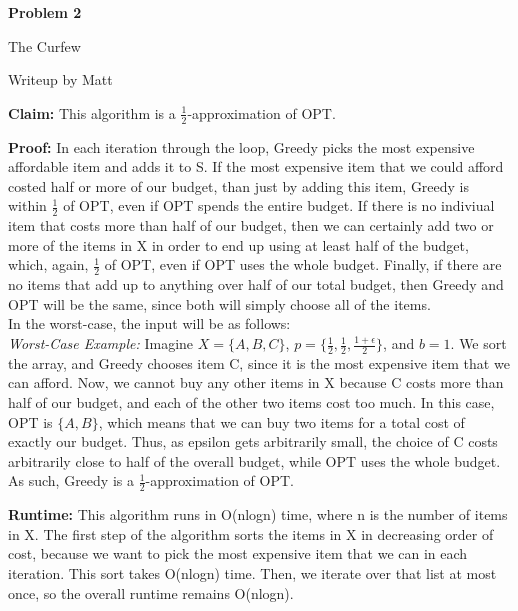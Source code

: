\documentclass[12pt]{article}
\begin{document}
\begin{center}
\textbf{Problem 2}
\end{center}

\begin{center}The Curfew

Writeup by Matt\end{center}


\bigskip
\noindent\textbf{Claim:} This algorithm is a $\frac{1}{2}$-approximation of OPT.

\bigskip
\noindent\textbf{Proof:} In each iteration through the loop, Greedy picks the most expensive affordable item and adds it to S. If the most expensive item that we could afford costed half or more of our budget, than just by adding this item, Greedy is within $\frac{1}{2}$ of OPT, even if OPT spends the entire budget. If there is no indiviual item that costs more than half of our budget, then we can certainly add two or more of the items in X in order to end up using at least half of the budget, which, again, $\frac{1}{2}$ of OPT, even if OPT uses the whole budget. Finally, if there are no items that add up to anything over half of our total budget, then Greedy and OPT will be the same, since both will simply choose all of the items.\\

\noindent In the worst-case, the input will be as follows:\\

\smallskip
\noindent\textit{Worst-Case Example:} Imagine $X = \{A, B, C\}$, $p = \{\frac{1}{2}, \frac{1}{2}, \frac{1+\epsilon}{2}\}$, and $b = 1$. We sort the array, and Greedy chooses item C, since it is the most expensive item that we can afford. Now, we cannot buy any other items in X because C costs more than half of our budget, and each of the other two items cost too much. In this case, OPT is $\{A, B\}$, which means that we can buy two items for a total cost of exactly our budget. Thus, as epsilon gets arbitrarily small, the choice of C costs arbitrarily close to half of the overall budget, while OPT uses the whole budget. As such, Greedy is a $\frac{1}{2}$-approximation of OPT.

\bigskip
\noindent\textbf{Runtime:} This algorithm runs in O(nlogn) time, where n is the number of items in X. The first step of the algorithm sorts the items in X in decreasing order of cost, because we want to pick the most expensive item that we can in each iteration. This sort takes O(nlogn) time. Then, we iterate over that list at most once, so the overall runtime remains O(nlogn).
\end{document}
